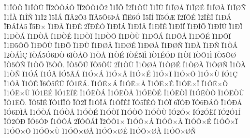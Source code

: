 {^^cf1^^ce^^d2^^d5
^^cf1^^ce^^d2^^d9
^^cf^^ce2^^d4^^d2^^c1^^d4
^^cf^^ce2^^d4^^d21^^d52
^^cf1^^ce^^d5
^^cf2^^ce1^^d5^^dc
^^cf1^^ce^^d9
^^cf1^^ce^^d8^^c5
^^cf1^^ce^^d8^^c9
^^cf1^^ce^^d8^^c0
^^cf1^^ce^^d8^^d1
^^cf1^^ce^^c0
^^cf1^^ce^^d1
^^cf1^^cf2
^^cf5^^cf^^c1
^^cf^^cf^^c22^^d53
^^cf^^cf^^c25^^d56^^de^^c5
^^cf^^cf^^cb6^^d3
^^cf5^^cf^^cd
^^cf^^cf5^^d3^^c6
^^cf2^^cf^^d4^^c9
^^cf2^^cf^^c8^^cf
^^cf1^^d0^^c1
^^cf^^d0^^c1^^cc^^c55
^^cf5^^d0^^d7
^^cf1^^d0^^c5
^^cf1^^d0^^c9
2^^cf^^d0^^c9^^d2
^^cf1^^d0^^cc^^c1
^^cf1^^d0^^cc^^c5
^^cf1^^d0^^cc^^c9
^^cf1^^d0^^cc^^cf
^^cf1^^d0^^cc^^d5
^^cf1^^d0^^cc^^d9
^^cf1^^d0^^cf
^^cf1^^d0^^d2^^c1
^^cf1^^d0^^d2^^c5
^^cf1^^d0^^d2^^c9
^^cf1^^d0^^d2^^cf
^^cf1^^d0^^d2^^d5
^^cf1^^d0^^d2^^d9
^^cf1^^d0^^d4^^c1
^^cf1^^d0^^d4^^c5
^^cf1^^d0^^d4^^c9
^^cf1^^d0^^d4^^cf
^^cf1^^d05^^d4^^d5
^^cf1^^d0^^d4^^d9
^^cf1^^d0^^d5
^^cf1^^d0^^d9
^^cf1^^d0^^d8^^c5
^^cf1^^d0^^d8^^c9
^^cf1^^d0^^d8^^c0
^^cf1^^d0^^d8^^d1
^^cf1^^d0^^c0
^^cf1^^d0^^d1
^^cf1^^d2^^c1
^^cf2^^d2^^c1^^cc^^c7
^^cf^^d2^^c15^^d36^^d0^^d2
6^^cf^^d2^^c1^^d4
^^cf1^^d2^^c5
^^cf1^^d2^^c9
^^cf^^d2^^c95^^cf^^cc
^^cf^^d21^^c9^^d3^^d0
^^cf1^^d2^^cf
^^cf^^d2^^d41^^cc
^^cf^^d25^^d4^^d8
^^cf^^d25^^d4^^d1
^^cf1^^d2^^d5
^^cf5^^d2^^d5.
^^cf^^d25^^d5^^da
^^cf^^d25^^d5^^dc
2^^cf1^^d2^^d9
^^cf1^^d2^^d8^^c5
^^cf1^^d2^^d8^^c9
^^cf1^^d2^^d8^^c0
^^cf1^^d2^^d8^^d1
^^cf1^^d2^^c0
^^cf1^^d2^^d1
^^cf1^^d3^^c1
^^cf1^^d3^^c2
^^cf^^d35^^c2^^c1
^^cf1^^d3^^d7^^c1
^^cf1^^d3^^d7^^c5
^^cf1^^d3^^d7^^c9
^^cf1^^d3^^d7^^cf
^^cf1^^d3^^d7^^d5
^^cf1^^d3^^d7^^d9
^^cf^^d31^^c7
^^cf1^^d3^^c5
^^cf1^^d3^^c9
^^cf6^^d35^^c9^^da
^^cf^^d31^^cb^^c1.
^^cf1^^d3^^cb^^d7^^c1
^^cf1^^d3^^cb^^d7^^c5
^^cf1^^d3^^cb^^d7^^c9
^^cf1^^d3^^cb^^d7^^cf
^^cf1^^d3^^cb^^d7^^d5
^^cf1^^d3^^cb^^d7^^d9
^^cf^^d31^^cb^^c9
^^cf^^d31^^cb^^cf^^ca
^^cf1^^d3^^cb^^d2^^c1
^^cf1^^d3^^cb^^d2^^c5
^^cf1^^d3^^cb^^d2^^c9
^^cf1^^d3^^cb^^d2^^cf
^^cf1^^d3^^cb^^d2^^d5
^^cf1^^d3^^cb^^d2^^d9
^^cf^^d31^^cb^^d5.
^^cf^^d35^^cd^^c9
^^cf^^d31^^cd^^cf^^d3
^^cf^^d32^^ce
^^cf1^^d3^^ce^^c5
^^cf1^^d3^^ce^^c9^^cd
^^cf^^d35^^ce^^c9^^d4
^^cf1^^d3^^cf
6^^cf^^d3^^d0
^^cf^^d36^^d0^^c1^^d4
^^cf1^^d3^^d0^^c5
^^cf^^d36^^d0^^cc^^c5
^^cf1^^d3^^d2^^c1
^^cf1^^d3^^d2^^c5
^^cf1^^d3^^d2^^c9
^^cf1^^d3^^d2^^cf
^^cf1^^d3^^d2^^d5
^^cf1^^d3^^d2^^d9
^^cf^^d32^^d3^^d7
^^cf^^d32^^d3^^cb^^cf
^^cf^^d32^^d31^^cd
^^cf^^d32^^d3^^d0
^^cf^^d36^^d3^^de
^^cf1^^d3^^d4^^c1
2^^cf^^d3^^d4^^c1^^cc
^^cf2^^d3^^d41^^d7
^^cf1^^d3^^d4^^d7^^c1
^^cf1^^d3^^d4^^d7^^c5
^^cf1^^d3^^d4^^d7^^c9
^^cf1^^d3^^d4^^d7^^cf
^^cf1^^d3^^d4^^d7^^d5
^^cf1^^d3^^d4^^d7^^d9
^^cf1^^d3^^d4^^d7^^d8^^c5
^^cf1^^d3^^d4^^d7^^d8^^c9
^^cf1^^d3^^d4^^d7^^d8^^c0
^^cf1^^d3^^d4^^d7^^d8^^d1
}
